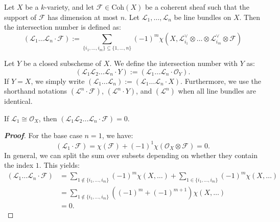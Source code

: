 
\begin{definition}[20.1.1]
Let $X$ be a $k$-variety, and let $\mathcal{F} \in \text{Coh}(X)$ be a coherent sheaf such that the support of $\mathcal{F}$ has dimension at most $n$. Let $\mathcal{L}_1, \dots, \mathcal{L}_n$ be line bundles on $X$. Then the intersection number is defined as:
\[
(\mathcal{L}_1 \dots \mathcal{L}_n \cdot \mathcal{F}) := \sum_{\{i_1, \dots, i_m\} \subseteq \{1, \dots, n\}} (-1)^m \chi(X, \mathcal{L}_{i_1}^\vee \otimes \dots \otimes \mathcal{L}_{i_m}^\vee \otimes \mathcal{F})
\]
\end{definition}

\begin{definition}[Notations]
Let $Y$ be a closed subscheme of $X$. We define the intersection number with $Y$ as:
\[
(\mathcal{L}_1 \mathcal{L}_2 \dots \mathcal{L}_n \cdot Y) := (\mathcal{L}_1 \dots \mathcal{L}_n \cdot \mathcal{O}_Y).
\]
If $Y = X$, we simply write $(\mathcal{L}_1 \dots \mathcal{L}_n) := (\mathcal{L}_1 \dots \mathcal{L}_n \cdot X)$. Furthermore, we use the shorthand notations $(\mathcal{L}^n \cdot \mathcal{F})$, $(\mathcal{L}^n \cdot Y)$, and $(\mathcal{L}^n)$ when all line bundles are identical.
\end{definition}

\begin{proposition}[20.1.A]
If $\mathcal{L}_1 \cong \mathcal{O}_X$, then $(\mathcal{L}_1 \mathcal{L}_2 \dots \mathcal{L}_n \cdot \mathcal{F}) = 0$.
\end{proposition}

\begin{proof}[\textbf{Proof}]
For the base case $n=1$, we have:
\[
(\mathcal{L}_1 \cdot \mathcal{F}) = \chi(\mathcal{F}) + (-1)^1 \chi(\mathcal{O}_X \otimes \mathcal{F}) = 0.
\]
In general, we can split the sum over subsets depending on whether they contain the index $1$. This yields:
\begin{align*}
(\mathcal{L}_1 \dots \mathcal{L}_n \cdot \mathcal{F}) &= \sum_{1 \notin \{i_1, \dots, i_m\}} (-1)^m \chi(X, \dots) + \sum_{1 \in \{i_1, \dots, i_m\}} (-1)^m \chi(X, \dots) \\
&= \sum_{1 \notin \{i_1, \dots, i_m\}} \left( (-1)^m + (-1)^{m+1} \right) \chi(X, \dots) \\
&= 0.
\end{align*}
\end{proof}

